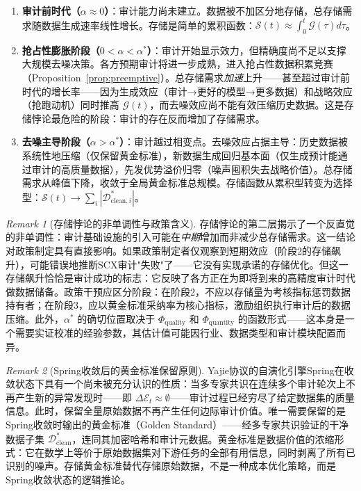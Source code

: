 \documentclass[12pt,a4paper]{ctexart}
\theoremstyle{definition}
\theoremstyle{remark}
\newtheorem{remark}{Remark}[section]
\begin{document}
\begin{enumerate}[label=\textbf{阶段 \arabic*}:, leftmargin=*]
\item \textbf{审计前时代（$\alpha \approx 0$）}：审计能力尚未建立。数据被不加区分地存储，总存储需求随数据生成速率线性增长。存储是简单的累积函数：$\mathcal{S}(t) \approx \int_0^t \mathcal{G}(\tau) d\tau$。

\item \textbf{抢占性膨胀阶段（$0 < \alpha < \alpha^*$）}：审计开始显示效力，但精确度尚不足以支撑大规模去噪决策。各方预期审计将进一步成熟，进入抢占性数据积累竞赛（Proposition~\ref{prop:preemptive}）。总存储需求\textit{加速}上升——甚至超过审计前时代的增长率——因为生成效应（审计→更好的模型→更多数据）和战略效应（抢跑动机）同时推高 $\mathcal{G}(t)$，而去噪效应尚不能有效压缩历史数据。这是存储悖论最危险的阶段：审计的存在反而增加了存储需求。

\item \textbf{去噪主导阶段（$\alpha > \alpha^*$）}：审计越过相变点。去噪效应占据主导：历史数据被系统性地压缩（仅保留黄金标准），新数据生成回归基本面（仅生成预计能通过审计的高质量数据），先发优势溢价归零（噪声囤积失去战略价值）。总存储需求从峰值下降，收敛于全局黄金标准总规模。存储函数从累积型转变为选择型：$\mathcal{S}(t) \to \sum_i |\mathcal{D}_{\text{clean}, i}^*|$。
\end{enumerate}

\begin{remark}[存储悖论的非单调性与政策含义]
存储悖论的第二层揭示了一个反直觉的非单调性：审计基础设施的引入可能在\textit{中期}增加而非减少总存储需求。这一结论对政策制定具有直接影响。如果政策制定者仅观察到短期效应（阶段2的存储飙升），可能错误地推断SCX审计"失败"了——它没有实现承诺的存储优化。但这一存储飙升恰恰是审计成功的标志：它反映了各方正在为即将到来的高精度审计时代做数据储备。政策干预应区分阶段：在阶段2，不应以存储量为考核指标惩罚数据持有者；在阶段3，应以黄金标准采纳率为核心指标，激励组织执行审计后的数据压缩。此外，$\alpha^*$ 的确切位置取决于 $\Phi_{\text{quality}}$ 和 $\Phi_{\text{quantity}}$ 的函数形式——这本身是一个需要实证校准的经验参数，其估计值可能因行业、数据类型和审计模块配置而异。
\end{remark}

\begin{remark}[Spring收敛后的黄金标准保留原则]
\label{rem:golden-standard}
Yajie协议的自演化引擎Spring在收敛状态下具有一个尚未被充分认识的性质：当多专家共识在连续多个审计轮次上不再产生新的异常发现时——即 $\Delta\mathcal{E}_t \approx \emptyset$——审计过程已经穷尽了给定数据集的质量信息。此时，保留全量原始数据不再产生任何边际审计价值。唯一需要保留的是Spring收敛时输出的黄金标准（Golden Standard）——经多专家共识验证的干净数据子集 $\mathcal{D}_{\text{clean}}^*$，连同其加密哈希和审计元数据。黄金标准是数据价值的浓缩形式：它在数学上等价于原始数据集对下游任务的全部有用信息，同时剥离了所有已识别的噪声。存储黄金标准替代存储原始数据，不是一种成本优化策略，而是Spring收敛状态的逻辑推论。
\end{remark}
\end{document}
